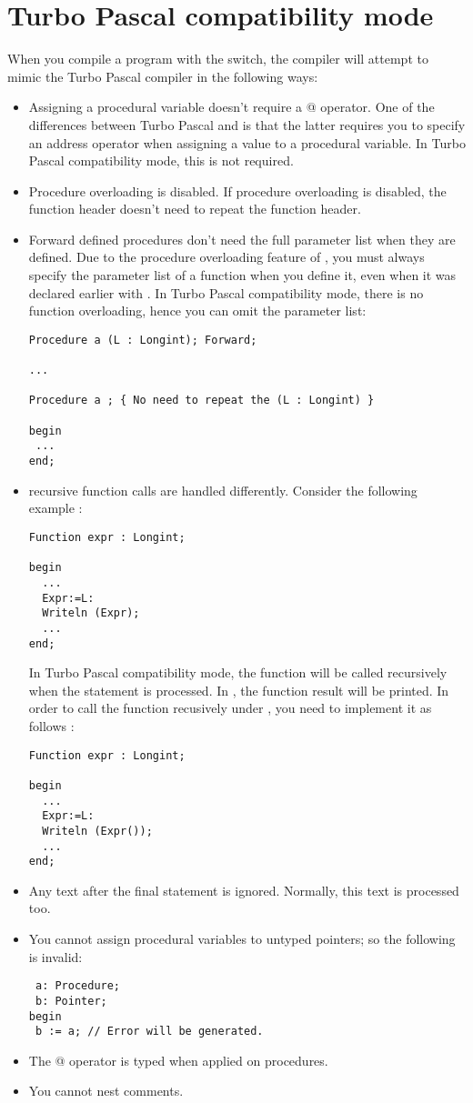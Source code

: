 \section{Turbo Pascal compatibility mode}
When you compile a program with the  switch, the compiler will
attempt to mimic the Turbo Pascal compiler in the following ways:
\begin{itemize}
\item Assigning a procedural variable doesn't require a @ operator. One of
the differences between Turbo Pascal and \fpc is that the latter requires
you to specify an address operator when assigning a value to a procedural
variable. In Turbo Pascal compatibility mode, this is not required.
\item Procedure overloading is disabled. If procedure overloading is
disabled, the function header doesn't need to repeat the function header.

\item Forward defined procedures don't need the full parameter list when
they are defined. Due to the procedure overloading feature of \fpc, you must
always specify the parameter list of a function when you define it, even
when it was declared earlier with . In Turbo Pascal
compatibility mode, there is no function overloading, hence you can omit the
parameter list:
\begin{verbatim}
Procedure a (L : Longint); Forward;

...

Procedure a ; { No need to repeat the (L : Longint) }

begin
 ...
end;

\end{verbatim}
\item recursive function calls are handled differently. Consider the
following example :
\begin{verbatim}
Function expr : Longint;

begin
  ...
  Expr:=L:
  Writeln (Expr);
  ...
end;
\end{verbatim}
In Turbo Pascal compatibility mode, the function will be called recursively
when the  statement is processed. In \fpc, the function result
will be printed. In order to call the function recusively under \fpc, you
need to implement it as follows :
\begin{verbatim}
Function expr : Longint;

begin
  ...
  Expr:=L:
  Writeln (Expr());
  ...
end;
\end{verbatim}
\item Any text after the final  statement is ignored. Normally,
this text is processed too.
\item You cannot assign procedural variables to untyped pointers; so the
following is invalid:
\begin{verbatim}
 a: Procedure;
 b: Pointer;
begin
 b := a; // Error will be generated.
\end{verbatim}
\item The @ operator is typed when applied on procedures.
\item You cannot nest comments.
\end{itemize}

